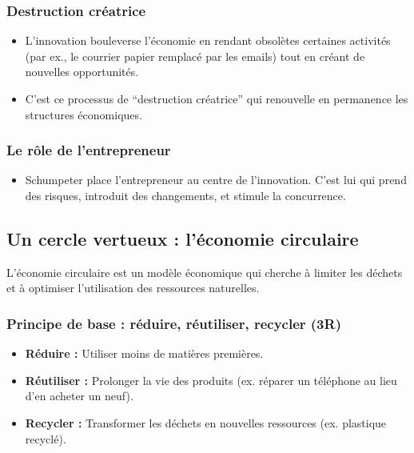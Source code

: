 \documentclass[
  letterpaper,
  DIV=11,
  numbers=noendperiod]{scrartcl}
\providecommand{\tightlist}{%
  \setlength{\itemsep}{0pt}\setlength{\parskip}{0pt}}\usepackage{longtable,booktabs,array}
\begin{document}
\subsubsection{Destruction créatrice}\label{destruction-cruxe9atrice}

\begin{itemize}
\item
  L'innovation bouleverse l'économie en rendant obsolètes certaines
  activités (par ex., le courrier papier remplacé par les emails) tout
  en créant de nouvelles opportunités.
\item
  C'est ce processus de ``destruction créatrice'' qui renouvelle en
  permanence les structures économiques.
\end{itemize}

\subsubsection{Le rôle de
l'entrepreneur}\label{le-ruxf4le-de-lentrepreneur}

\begin{itemize}
\tightlist
\item
  Schumpeter place l'entrepreneur au centre de l'innovation. C'est lui
  qui prend des risques, introduit des changements, et stimule la
  concurrence.
\end{itemize}

\subsection{Un cercle vertueux : l'économie
circulaire}\label{un-cercle-vertueux-luxe9conomie-circulaire}

L'économie circulaire est un modèle économique qui cherche à limiter les
déchets et à optimiser l'utilisation des ressources naturelles.

\subsubsection{Principe de base : réduire, réutiliser, recycler
(3R)}\label{principe-de-base-ruxe9duire-ruxe9utiliser-recycler-3r}

\begin{itemize}
\tightlist
\item
  \textbf{Réduire :} Utiliser moins de matières premières.
\item
  \textbf{Réutiliser :} Prolonger la vie des produits (ex. réparer un
  téléphone au lieu d'en acheter un neuf).
\item
  \textbf{Recycler :} Transformer les déchets en nouvelles ressources
  (ex. plastique recyclé).
\end{itemize}
\end{document}
